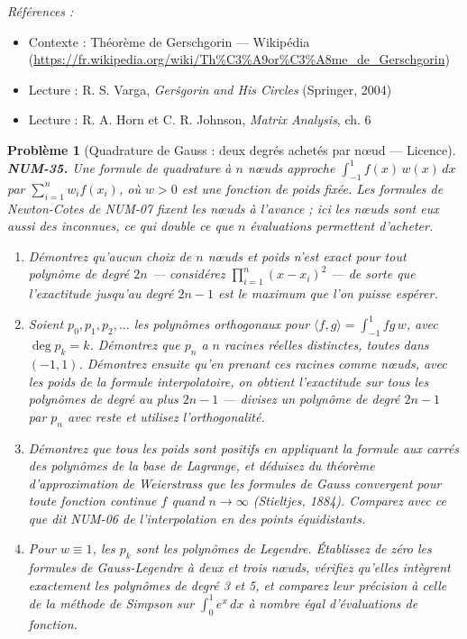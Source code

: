 \documentclass[11pt]{article}
\newtheorem{problem}{Problème}
\newenvironment{refs}{\par\small\noindent\emph{Références :}\begin{itemize}\setlength\itemsep{0pt}}{\end{itemize}\normalsize}
\begin{document}
\begin{refs}
\item Contexte : Théorème de Gerschgorin --- Wikipédia (\url{https://fr.wikipedia.org/wiki/Th%C3%A9or%C3%A8me_de_Gerschgorin})
\item Lecture : R. S. Varga, \textit{Ger\v{s}gorin and His Circles} (Springer, 2004)
\item Lecture : R. A. Horn et C. R. Johnson, \textit{Matrix Analysis}, ch. 6
\end{refs}

\bigskip

\begin{problem}[{Quadrature de Gauss : deux degrés achetés par n\oe{}ud --- Licence}]
\textbf{NUM-35.} Une formule de quadrature à $n$ n\oe{}uds approche $\int_{-1}^{1} f(x)\,w(x)\,dx$ par $\sum_{i=1}^{n} w_i f(x_i)$, où $w > 0$ est une fonction de poids fixée. Les formules de Newton-Cotes de NUM-07 fixent les n\oe{}uds à l'avance ; ici les n\oe{}uds sont eux aussi des inconnues, ce qui double ce que $n$ évaluations permettent d'acheter.
\begin{enumerate}
\item[(a)] Démontrez qu'aucun choix de $n$ n\oe{}uds et poids n'est exact pour tout polynôme de degré $2n$ --- considérez $\prod_{i=1}^{n}(x - x_i)^2$ --- de sorte que l'exactitude jusqu'au degré $2n-1$ est le maximum que l'on puisse espérer.
\item[(b)] Soient $p_0, p_1, p_2, \ldots$ les polynômes orthogonaux pour $\langle f, g\rangle = \int_{-1}^{1} fg\,w$, avec $\deg p_k = k$. Démontrez que $p_n$ a $n$ racines réelles distinctes, toutes dans $(-1,1)$. Démontrez ensuite qu'en prenant ces racines comme n\oe{}uds, avec les poids de la formule interpolatoire, on obtient l'exactitude sur tous les polynômes de degré au plus $2n-1$ --- divisez un polynôme de degré $2n-1$ par $p_n$ avec reste et utilisez l'orthogonalité.
\item[(c)] Démontrez que tous les poids sont positifs en appliquant la formule aux carrés des polynômes de la base de Lagrange, et déduisez du théorème d'approximation de Weierstrass que les formules de Gauss convergent pour \textit{toute} fonction continue $f$ quand $n \to \infty$ (Stieltjes, 1884). Comparez avec ce que dit NUM-06 de l'interpolation en des points équidistants.
\item[(d)] Pour $w \equiv 1$, les $p_k$ sont les polynômes de Legendre. Établissez de zéro les formules de Gauss-Legendre à deux et trois n\oe{}uds, vérifiez qu'elles intègrent exactement les polynômes de degré 3 et 5, et comparez leur précision à celle de la méthode de Simpson sur $\int_0^1 e^x\,dx$ à nombre égal d'évaluations de fonction.

\end{enumerate}
\end{problem}
\end{document}

